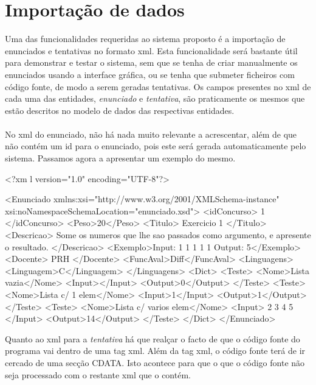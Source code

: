 \section{Importação de dados}\label{sec xml}

Uma das funcionalidades requeridas ao sistema proposto é a importação de enunciados e tentativas no formato xml.
Esta funcionalidade será bastante útil para demonstrar e testar o sistema, sem que se tenha de criar manualmente os enunciados
 usando a interface gráfica, ou se tenha que submeter ficheiros com código fonte, de modo a serem geradas tentativas.
Os campos presentes no xml de cada uma das entidades, \textit{enunciado} e \textit{tentativa}, são praticamente os mesmos 
que estão descritos no modelo de dados das respectivas entidades.\\
\\
No xml do enunciado, não há nada muito relevante a acrescentar, além de que não contém um id para o enunciado, pois este será gerada 
automaticamente pelo sistema. Passamos agora a apresentar um exemplo do mesmo.
\\
\begin{myxml}
<?xm l version="1.0" encoding="UTF-8"?>

<Enunciado xmlns:xsi="http://www.w3.org/2001/XMLSchema-instance"
    xsi:noNamespaceSchemaLocation="enunciado.xsd">
    <idConcurso> 1 </idConcurso>
    <Peso>20</Peso>
    <Titulo> Exercicio 1 </Titulo>
    <Descricao> Some os numeros que lhe sao passados como argumento, e apresente o resultado. </Descricao>
    <Exemplo>Input: 1 1 1 1 1   Output: 5</Exemplo>
    <Docente> PRH </Docente>
    <FuncAval>Diff</FuncAval>  
    <Linguagens> 
        <Linguagem>C</Linguagem>        
    </Linguagens>
    <Dict>
        <Teste>
            <Nome>Lista vazia</Nome>
            <Input></Input>
            <Output>0</Output>
        </Teste>
        <Teste>
            <Nome>Lista c/ 1 elem</Nome>
            <Input>1</Input>
            <Output>1</Output>
        </Teste>
        <Teste>
            <Nome>Lista c/ varios elem</Nome>
            <Input> 2 3 4 5 </Input>
            <Output>14</Output>
        </Teste>
    </Dict>
</Enunciado>
\end{myxml}


Quanto ao xml para a \textit{tentativa} há que realçar o facto de que o código fonte do programa vai dentro de uma tag xml. Além da tag xml, o código fonte
terá de ir cercado de uma secção CDATA. Isto acontece para que o que o código fonte não seja processado com o restante xml que o contém.\\
\\

